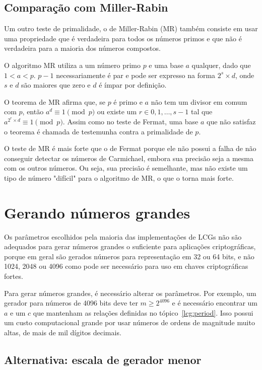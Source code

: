 \documentclass[12pt]{article}
\begin{document}
\subsection{Comparação com Miller-Rabin}

Um outro teste de primalidade, o de Miller-Rabin (MR) também consiste em usar
uma propriedade que é verdadeira para todos os números primos e que não é
verdadeira para a maioria dos números compostos.

O algoritmo MR utiliza a um número primo $p$ e uma base $a$ qualquer, dado que
$1 < a < p$. $p - 1$ necessariamente é par e pode ser expresso na forma
$2^{s} \times d$, onde $s$ e $d$ são maiores que zero e $d$ é ímpar por
definição.

O teorema de MR afirma que, se $p$ é primo e $a$ não tem um divisor em comum
com $p$, então $a^{d} \equiv 1 \pmod{p}$ ou existe um
$r \in {0, 1, \ldots, s - 1}$ tal que $a^{2^{r} \times d} \equiv 1 \pmod{p}$.
Assim como no teste de Fermat, uma base $a$ que não satisfaz o teorema é
chamada de testemunha contra a primalidade de $p$.

O teste de MR é mais forte que o de Fermat porque ele não possui a falha de
não conseguir detectar os números de Carmichael, embora sua precisão seja a
mesma com os outros números. Ou seja, sua precisão é semelhante, mas não existe
um tipo de número "difícil" para o algoritmo de MR, o que o torna mais forte.

\section{Gerando números grandes}

Os parâmetros escolhidos pela maioria das implementações de LCGs não são
adequados para gerar números grandes o suficiente para aplicações
criptográficas, porque em geral são gerados números para representação em 32
ou 64 bits, e não 1024, 2048 ou 4096 como pode ser necessário para uso em
chaves criptográficas fortes.

Para gerar números grandes, é necessário alterar os parâmetros. Por exemplo, um
gerador para números de 4096 bits deve ter $m \geq 2^{4096}$ e é necessário
encontrar um $a$ e um $c$ que mantenham as relações definidas no
tópico~\ref{lcg:period}. Isso possui um custo computacional grande por usar
números de ordens de magnitude muito altas, de mais de mil dígitos decimais.

\subsection{Alternativa: escala de gerador menor}
\end{document}
